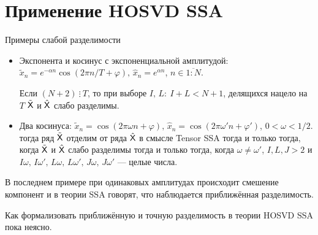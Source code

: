 \documentclass[ucs, notheorems, handout]{beamer}
\begin{document}
    \section{Применение HOSVD SSA}\label{sec:tssa-use}
    \begin{frame}{Примеры слабой разделимости}
        \begin{itemize}
            \item Экспонента и косинус с экспоненциальной амплитудой: $\tilde{x}_n=e^{-\alpha n}\cos(2\pi n / T + \varphi),\, \hat{x}_n=e^{\alpha n}$, $n \in \overline{1:N}$.

            Если $(N+2)\: \vdots \: T$, то при выборе $I,\, L:\: I+L< N+1$, делящихся нацело на $T$ $\tilde{\mathsf{X}}$ и $\hat{\mathsf{X}}$
            слабо разделимы.

            \item Два косинуса: $\tilde{x}_n=\cos(2\pi \omega n + \varphi),\, \hat{x}_n=\cos(2\pi \omega' n + \varphi')$, $0 < \omega < 1/2$.
            тогда ряд $\tilde{\mathsf{X}}$ отделим от ряда $\hat{\mathsf{X}}$ в смысле Tensor SSA тогда и только тогда, когда
            $\tilde{\mathsf{X}}$ и $\hat{\mathsf{X}}$ слабо разделимы тогда и только тогда, когда $\omega\ne\omega'$, $I, L, J > 2$ и $I\omega,\,
            I\omega',\, L\omega,\, L\omega',\, J\omega,\, J\omega'$ --- целые числа.
        \end{itemize}

        \vspace{0.3cm}
        В последнем примере при одинаковых амплитудах происходит смешение компонент и в теории SSA говорят,
        что наблюдается приближённая разделимость.

        Как формализовать приближённую и точную разделимость в теории HOSVD SSA пока неясно.

    \end{frame}
\end{document}
